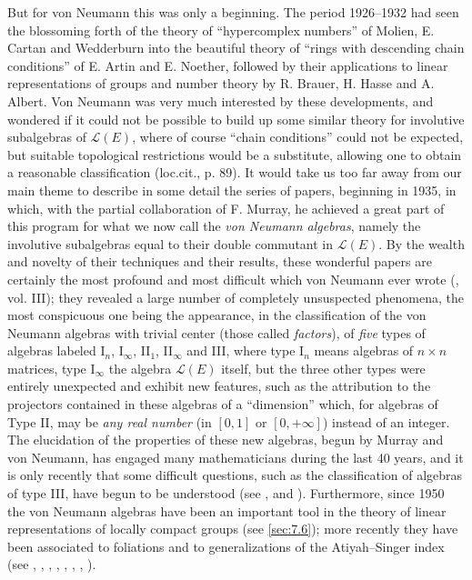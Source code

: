 \documentclass[12pt,a4paper,leqno,twoside]{extbook}
\begin{document}
But for von Neumann this was only a beginning. The period 1926--1932 had seen the blossoming forth of the theory of ``hypercomplex numbers'' of Molien, E. Cartan and Wedderburn into the beautiful theory of ``rings with descending chain conditions'' of E. Artin and E. Noether, followed by their applications to linear representations of groups and number theory by R. Brauer, H. Hasse and A. Albert. Von Neumann was very much interested by these developments, and wondered if it could not be possible to build up some similar theory for involutive subalgebras of \(\mathcal{L}(E)\), where of course ``chain conditions'' could not be expected, but suitable topological restrictions would be a substitute, allowing one to obtain a reasonable classification (loc.cit., p. 89). It would take us too far away from our main theme to describe in some detail the series of papers, beginning in 1935, in which, with the partial collaboration of F. Murray, he achieved a great part of this program for what we now call the \emph{von Neumann algebras}, namely the involutive subalgebras equal to their double commutant in \(\mathcal{L}(E)\). By the wealth and novelty of their techniques and their results, these wonderful papers are certainly the most profound and most difficult which von Neumann ever wrote (\cite{221}, vol. III); they revealed a large number of completely unsuspected phenomena, the most conspicuous one being the appearance, in the classification of the von Neumann algebras with trivial center (those called \emph{factors}), of \emph{five} types of algebras labeled I\(_n\), I\(_\infty\), II\(_1\), II\(_\infty\) and III, where type I\(_n\) means algebras of \(n \times n\) matrices, type I\(_\infty\) the algebra \(\mathcal{L}(E)\) itself, but the three other types were entirely unexpected and exhibit new features, such as the attribution to the projectors contained in these algebras of a ``dimension'' which, for algebras of Type II, may be \emph{any real number} (in \([0,1]\) or \([0,+\infty]\)) instead of an integer. The elucidation of the properties of these new algebras, begun by Murray and von Neumann, has engaged many mathematicians during the last 40 years, and it is only recently that some difficult questions, such as the classification of algebras of type III, have begun to be understood (see \cite{057}, \cite{210} and \cite{044}). Furthermore, since 1950 the von Neumann algebras have been an important tool in the theory of linear representations of locally compact groups (see \ref{sec:7.6}); more recently they have been associated to foliations and to generalizations of the Atiyah--Singer index (see \cite{058}, \cite{010}, \cite{031}, \cite{036}, \cite{045}, \cite{113}, \cite{132}, \cite{199}).
\end{document}
